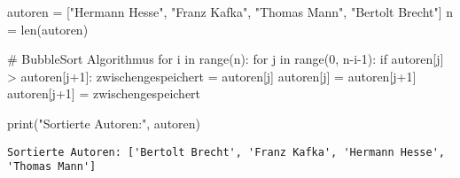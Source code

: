 \documentclass[
  letterpaper,
  DIV=11,
  numbers=noendperiod]{scrartcl}
\newenvironment{Shaded}{\begin{snugshade}}{\end{snugshade}}
\newcommand{\BuiltInTok}[1]{\textcolor[rgb]{0.00,0.23,0.31}{#1}}
\newcommand{\CommentTok}[1]{\textcolor[rgb]{0.37,0.37,0.37}{#1}}
\newcommand{\ControlFlowTok}[1]{\textcolor[rgb]{0.00,0.23,0.31}{#1}}
\newcommand{\DecValTok}[1]{\textcolor[rgb]{0.68,0.00,0.00}{#1}}
\newcommand{\KeywordTok}[1]{\textcolor[rgb]{0.00,0.23,0.31}{#1}}
\newcommand{\NormalTok}[1]{\textcolor[rgb]{0.00,0.23,0.31}{#1}}
\newcommand{\OperatorTok}[1]{\textcolor[rgb]{0.37,0.37,0.37}{#1}}
\newcommand{\StringTok}[1]{\textcolor[rgb]{0.13,0.47,0.30}{#1}}
\begin{document}
\begin{Shaded}
\begin{Highlighting}[]
\NormalTok{autoren }\OperatorTok{=}\NormalTok{ [}\StringTok{"Hermann Hesse"}\NormalTok{, }\StringTok{"Franz Kafka"}\NormalTok{, }\StringTok{"Thomas Mann"}\NormalTok{, }\StringTok{"Bertolt Brecht"}\NormalTok{]}
\NormalTok{n }\OperatorTok{=} \BuiltInTok{len}\NormalTok{(autoren)}

\CommentTok{\# BubbleSort Algorithmus}
\ControlFlowTok{for}\NormalTok{ i }\KeywordTok{in} \BuiltInTok{range}\NormalTok{(n):}
    \ControlFlowTok{for}\NormalTok{ j }\KeywordTok{in} \BuiltInTok{range}\NormalTok{(}\DecValTok{0}\NormalTok{, n}\OperatorTok{{-}}\NormalTok{i}\OperatorTok{{-}}\DecValTok{1}\NormalTok{):}
        \ControlFlowTok{if}\NormalTok{ autoren[j] }\OperatorTok{\textgreater{}}\NormalTok{ autoren[j}\OperatorTok{+}\DecValTok{1}\NormalTok{]:}
\NormalTok{            zwischengespeichert }\OperatorTok{=}\NormalTok{ autoren[j]}
\NormalTok{            autoren[j] }\OperatorTok{=}\NormalTok{ autoren[j}\OperatorTok{+}\DecValTok{1}\NormalTok{]}
\NormalTok{            autoren[j}\OperatorTok{+}\DecValTok{1}\NormalTok{] }\OperatorTok{=}\NormalTok{ zwischengespeichert}

\BuiltInTok{print}\NormalTok{(}\StringTok{"Sortierte Autoren:"}\NormalTok{, autoren)}
\end{Highlighting}
\end{Shaded}

\begin{verbatim}
Sortierte Autoren: ['Bertolt Brecht', 'Franz Kafka', 'Hermann Hesse', 'Thomas Mann']
\end{verbatim}
\end{document}
